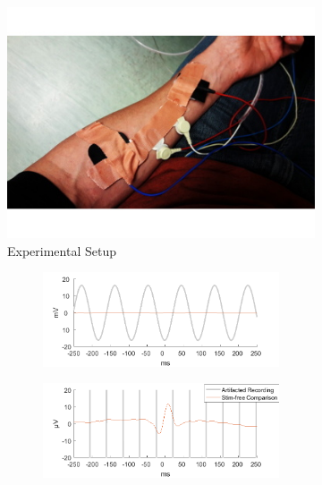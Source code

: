 \documentclass[a4paper]{article}
\begin{document}
\begin{figure}[hbtp]
    \begin{subfigure}{.245\textwidth}
        \includegraphics[width=\textwidth]{./img/div/upper_limb_ecg.jpg}
    \caption{Experimental Setup}
    \end{subfigure}
    \begin{subfigure}{.75\textwidth}
        \begin{subfigure}{.45\textwidth}
            \includegraphics[width=\textwidth]{./img/eva/ecg_raw_1.png}
        \end{subfigure}
        \begin{subfigure}{.45\textwidth}
            \includegraphics[width=\textwidth]{./img/eva/ecg_raw_2.png}

\end{subfigure}
\end{subfigure}
\end{figure}
\end{document}
